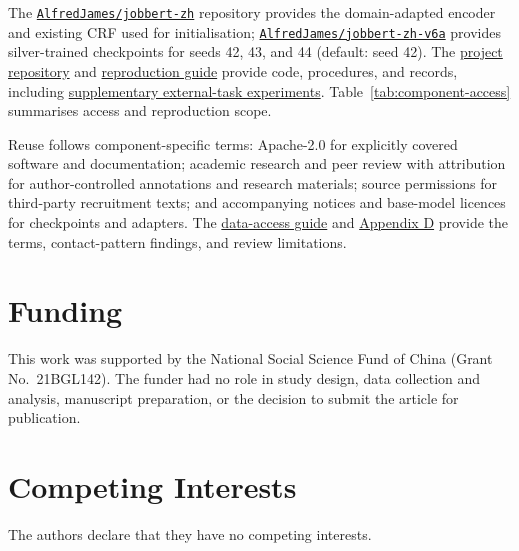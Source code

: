 \documentclass[fleqn,12pt,lineno]{wlpeerj}
\begin{document}
\begin{sloppypar}
The \href{https://huggingface.co/AlfredJames/jobbert-zh}{\nolinkurl{AlfredJames/jobbert-zh}} repository provides the domain-adapted encoder and existing CRF used for initialisation; \href{https://huggingface.co/AlfredJames/jobbert-zh-v6a}{\nolinkurl{AlfredJames/jobbert-zh-v6a}} provides silver-trained checkpoints for seeds 42, 43, and 44 (default: seed 42). The \href{https://github.com/AlfredJamesLi/chinese-skillspan-benchmark}{project repository} and \href{https://github.com/AlfredJamesLi/chinese-skillspan-benchmark/blob/main/REPRODUCIBILITY.md}{reproduction guide} provide code, procedures, and records, including \href{https://github.com/AlfredJamesLi/chinese-skillspan-benchmark/tree/main/reproduction/major_revision_20261004/external_experiments}{supplementary external-task experiments}. Table~\ref{tab:component-access} summarises access and reproduction scope.

Reuse follows component-specific terms: Apache-2.0 for explicitly covered software and documentation; academic research and peer review with attribution for author-controlled annotations and research materials; source permissions for third-party recruitment texts; and accompanying notices and base-model licences for checkpoints and adapters. The \href{https://github.com/AlfredJamesLi/chinese-skillspan-benchmark/blob/main/DATA_AVAILABILITY.md}{data-access guide} and \hyperref[app:d]{Appendix D} provide the terms, contact-pattern findings, and review limitations.
\end{sloppypar}


\FloatBarrier

\section{Funding}
This work was supported by the National Social Science Fund of China (Grant No.~21BGL142). The funder had no role in study design, data collection and analysis, manuscript preparation, or the decision to submit the article for publication.

\section{Competing Interests}
The authors declare that they have no competing interests.


\begingroup
{}

\endgroup
\end{document}
